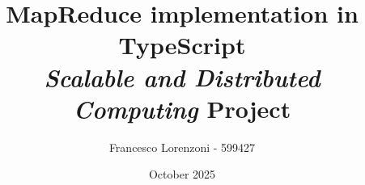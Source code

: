 


\lstset{language=JavaScript}



\lstset{
  language=JavaScript
}

\let\oldverb\verb

\makeatletter
\def\verb{\@ifnextchar|{\verb@colored}{\oldverb}}
\def\verb@colored|#1|{\colorbox{mybg}{\footnotesize\ttfamily\color{mytext}\detokenize{#1}}}
\makeatother

\title{MapReduce implementation in TypeScript \\{\large \textit{Scalable and Distributed Computing} Project}}
\author{Francesco Lorenzoni - 599427}
\date{October 2025}



\maketitle
\tableofcontents



